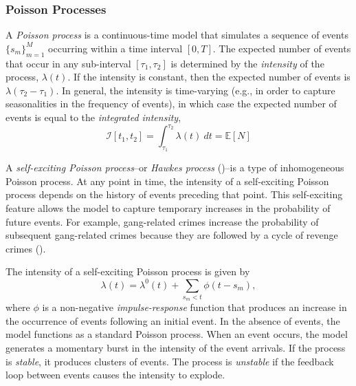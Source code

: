 \subsubsection{Poisson Processes}
A \textit{Poisson process} is a continuous-time model that simulates a sequence of events $\{s_m\}_{m=1}^M$ occurring within a time interval $\left[0, T\right]$. The expected number of events that occur in any sub-interval $[\tau_1, \tau_2]$ is determined by the \textit{intensity} of the process, $\lambda(t)$. If the intensity is constant, then the expected number of events is $\lambda (\tau_2 - \tau_1)$. In general, the intensity is time-varying (e.g., in order to capture seasonalities in the frequency of events), in which case the expected number of events is equal to the \textit{integrated intensity},
\begin{equation}
	\mathcal{I}\left[t_1, t_2\right] = \int_{\tau_1}^{\tau_2} \lambda(t) \ dt = \mathbb{E} \left[ N \right]
\end{equation}



A \textit{self-exciting Poisson process}--or \textit{Hawkes process} (\cite{Hawkes1971})--is a type of inhomogeneous Poisson process. At any point in time, the intensity of a self-exciting Poisson process depends on the history of events preceding that point. This self-exciting feature allows the model to capture temporary increases in the probability of future events. For example, gang-related crimes increase the probability of subsequent gang-related crimes because they are followed by a cycle of revenge crimes (\cite{Cho2013}).

The intensity of a self-exciting Poisson process is given by
\begin{equation}
	\lambda(t) = \lambda^0(t) + \sum_{s_m < t} \phi(t - s_m),
\end{equation}
where $\phi$ is a non-negative \textit{impulse-response} function that produces an increase in the occurrence of events following an initial event. In the absence of events, the model functions as a standard Poisson process. When an event occurs, the model generates a momentary burst in the intensity of the event arrivals. If the process is \textit{stable}, it produces clusters of events. The process is \textit{unstable} if the feedback loop between events causes the intensity to explode.

